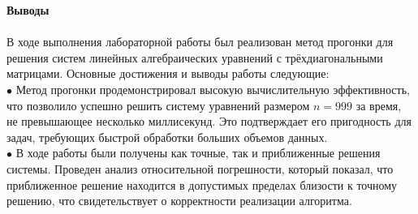 \documentclass[a4paper, 12pt]{report}
\begin{document}
    \newpage
   \textbf{\Huge{Выводы}}\\\\
      В ходе выполнения лабораторной работы был реализован метод прогонки для решения систем линейных алгебраических уравнений с трёхдиагональными матрицами. Основные достижения и выводы работы следующие:\\

$\bullet$ Метод прогонки продемонстрировал высокую вычислительную эффективность, что позволило успешно решить систему уравнений размером $n = 999$ за время, не превышающее несколько миллисекунд. Это подтверждает его пригодность для задач, требующих быстрой обработки больших объемов данных.\\

$\bullet$ В ходе работы были получены как точные, так и приближенные решения системы. Проведен анализ относительной погрешности, который показал, что приближенное решение находится в допустимых пределах близости к точному решению, что свидетельствует о корректности реализации алгоритма.\\
   
\end{document}
